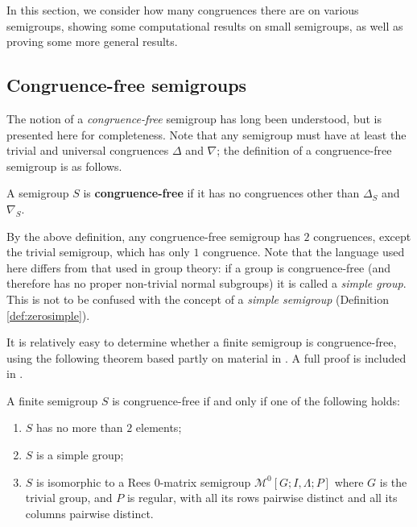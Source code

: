 In this section, we consider how many congruences there are on various
semigroups, showing some computational results on small semigroups, as well as
proving some more general results.

\subsection{Congruence-free semigroups}
\label{sec:congruence-free}

The notion of a \textit{congruence-free} semigroup has long been understood, but
is presented here for completeness.  Note that any semigroup must have at least
the trivial and universal congruences $\Delta$ and $\nabla$; the definition of
a congruence-free semigroup is as follows.

\begin{definition}
  \label{def:congruence-free}
  A semigroup $S$ is \textbf{congruence-free} if it has no congruences other
  than $\Delta_S$ and $\nabla_S$.
\end{definition}

By the above definition, any congruence-free semigroup has $2$ congruences,
except the trivial semigroup, which has only $1$ congruence.  Note that the
language used here differs from that used in group theory: if a group is
congruence-free (and therefore has no proper non-trivial normal subgroups) it is
called a \textit{simple group}.  This is not to be confused
with the concept of a \textit{simple semigroup} (Definition
\ref{def:zerosimple}).

It is relatively easy to determine whether a finite semigroup is
congruence-free, using the following theorem based partly on material in
\cite[\S3.7]{howie}.  A full proof is included in \cite[Chapter
5]{mtorpey_pre_msc}.

\begin{proposition}
  \label{prop:congruence-free}
  A finite semigroup $S$ is congruence-free if and only if one of the following
  holds:
  \begin{enumerate}[\rm(1)]
  \item $S$ has no more than $2$ elements;
  \item $S$ is a simple group;
  \item $S$ is isomorphic to a Rees 0-matrix semigroup
    $\mathcal{M}^0[G;I,\Lambda;P]$ where $G$ is the trivial group, and $P$ is
    regular, with all its rows pairwise distinct and all its columns pairwise
    distinct.
  \end{enumerate}
\end{proposition}


